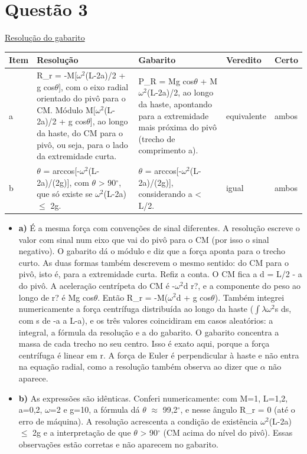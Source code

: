 \documentclass{article}%
\begin{document}
\section*{Questão 3}%
\href{https://poliedroresolve.sistemapoliedro.com.br/vestibulares/ita/2026/ita-2-fase-dia-3-30-10-2025-2-fase-dia-3/dissertativa-3-fisica-2-fase-dia-3-ita-2026}{Resolução do gabarito}\par\smallskip%
\begin{longtable}{@{}p{} p{} p{} p{} p{}@{}}\toprule Item & Resolução & Gabarito & Veredito & Certo \\ \midrule
a & R\_r = -M{[}$\omega$$^2$(L-2a)/2 + g cos$\theta${]}, com o eixo radial orientado do pivô para o CM. Módulo M{[}$\omega$$^2$(L-2a)/2 + g cos$\theta${]}, ao longo da haste, do CM para o pivô, ou seja, para o lado da extremidade curta. & P\_R = Mg cos$\theta$ + M$\omega$$^2$(L-2a)/2, ao longo da haste, apontando para a extremidade mais próxima do pivô (trecho de comprimento a). & equivalente & ambos \\
b & $\theta$ = arccos{[}-$\omega$$^2$(L-2a)/(2g){]}, com $\theta$ > 90$^\circ$, que só existe se $\omega$$^2$(L-2a) $\leq$ 2g. & $\theta$ = arccos{[}-$\omega$$^2$(L-2a)/(2g){]}, considerando a < L/2. & igual & ambos \\
\bottomrule\end{longtable}%
\begin{itemize}%
\item%
\textbf{a)} É a mesma força com convenções de sinal diferentes. A resolução escreve o valor com sinal num eixo que vai do pivô para o CM (por isso o sinal negativo). O gabarito dá o módulo e diz que a força aponta para o trecho curto. As duas formas também descrevem o mesmo sentido: do CM para o pivô, isto é, para a extremidade curta. Refiz a conta. O CM fica a d = L/2 - a do pivô. A aceleração centrípeta do CM é -$\omega$$^2$d r?, e a componente do peso ao longo de r? é Mg cos$\theta$. Então R\_r = -M($\omega$$^2$d + g cos$\theta$). Também integrei numericamente a força centrífuga distribuída ao longo da haste ($\int$$\lambda$$\omega$$^2$s ds, com s de -a a L-a), e os três valores coincidiram em casos aleatórios: a integral, a fórmula da resolução e a do gabarito. O gabarito concentra a massa de cada trecho no seu centro. Isso é exato aqui, porque a força centrífuga é linear em r. A força de Euler é perpendicular à haste e não entra na equação radial, como a resolução também observa ao dizer que $\alpha$ não aparece.%
\item%
\textbf{b)} As expressões são idênticas. Conferi numericamente: com M=1, L=1,2, a=0,2, $\omega$=2 e g=10, a fórmula dá $\theta$ $\approx$ 99,2$^\circ$, e nesse ângulo R\_r = 0 (até o erro de máquina). A resolução acrescenta a condição de existência $\omega$$^2$(L-2a) $\leq$ 2g e a interpretação de que $\theta$ > 90$^\circ$ (CM acima do nível do pivô). Essas observações estão corretas e não aparecem no gabarito.%
\end{itemize}%
\end{document}
